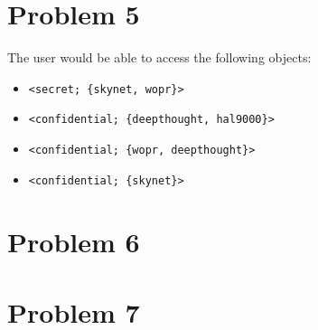 \documentclass{article}
\begin{document}
\section*{Problem 5}
The user would be able to access the following objects:\\
\begin{itemize}
  \item  \verb|<secret; {skynet, wopr}>|
  \item \verb|<confidential; {deepthought, hal9000}>|
  \item \verb|<confidential; {wopr, deepthought}>|
  \item \verb|<confidential; {skynet}>|
\end{itemize}
\section*{Problem 6}

\section*{Problem 7}
\end{document}
